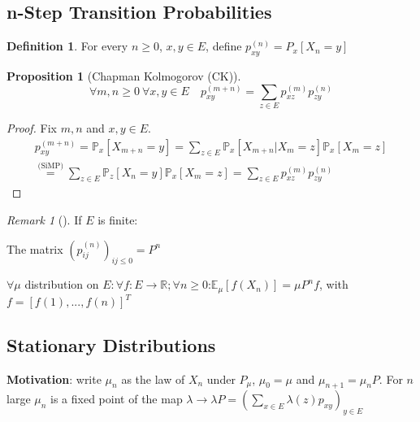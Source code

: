 \documentclass[12pt]{book}
\newtheorem{prop}[theorem]{Proposition}
\theoremstyle{definition}
\newtheorem{defn}{Definition}[section]
\theoremstyle{remark}
\newtheorem{rmk}[theorem]{Remark}
\begin{document}
\noindent
\subsection{n-Step Transition Probabilities}
\begin{defn}
	For every $n\geq0$, $x, y \in E$, define $p_{xy}^{(n)}=P_x[X_n=y]$
\end{defn}

\begin{prop}[Chapman Kolmogorov (CK)]
\begin{equation}
	\forall m,n \geq 0 \ \forall x,y \in E \quad \boxed{ p_{xy}^{(m+n)}= \sum_{z \in E} p_{xz}^{(m)}p_{zy}^{(n)}}
\end{equation}
	
\end{prop}
\begin{proof}
Fix $m,n$ and $x,y \in E$.
	\begin{align}
		p_{xy}^{(m+n)} =\mathbb{P}_{x} \left[ X_{m+n}=y \right] = \sum_{z \in E}^{} \mathbb{P}_{x} \left[ X_{m+n} | X_m = z \right] \mathbb{P}_{x} \left[ X_m = z \right] \\
		\stackrel{\textrm{(SiMP)}}{=} \sum_{z \in E}^{} \mathbb{P}_{z} \left[ X_n=y \right] \mathbb{P}_{x} \left[ X_m=z \right] = \sum_{z \in E}^{} p_{xz}^{(m)} p_{zy}^{(n)}  	
	\end{align}
	
\end{proof}


\begin{rmk}[]
	If $E$ is finite:
\itemize
\item The matrix $(p_{ij}^{(n)})_{ij \leq 0}=P^n$
\item $\forall  \mu$ distribution on $E: \forall f:E \to \mathbb{R}; \forall n \geq0$:\quad $\mathbb{E}_{\mu} \left[ f(X_n) \right] = \mu P^n f$, with $f = [f(1),...,f(n)]^T$
\end{rmk}

\subsection{Stationary Distributions}
\textbf{Motivation}: write $\mu_{n}$ as the law of $X_{n}$ under $P_{\mu}$, $\mu_0=\mu$ and $\mu_{n+1}=\mu_{n}P$. For $n$ large $\mu_n$ is a fixed point of the map $\lambda \to \lambda P = \left( \sum_{x \in E} \lambda(z)p_{xy} \right)_{y \in E}$
\end{document}
